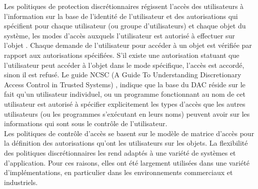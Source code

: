 Les politiques de protection discrétionnaires régissent l'accès des utilisateurs à l'information sur la base de l'identité de l'utilisateur et des autorisations qui spécifient pour chaque utilisateur (ou groupe d'utilisateurs) et chaque objet du système, les modes d'accès auxquels l'utilisateur est autorisé à effectuer sur l'objet \cite{sandhu94}. Chaque demande de l'utilisateur pour accéder à un objet est vérifiée par rapport aux autorisations spécifiées. S'il existe une autorisation statuant que l'utilisateur peut accéder à l'objet dans le mode spécifique, l'accès est accordé, sinon il est refusé. Le guide NCSC (A Guide To Understanding Discretionary Access Control in Trusted Systems) \cite{jordan87}, indique que la base du DAC réside sur le fait qu'un utilisateur individuel, ou un programme fonctionnant au nom de cet utilisateur est autorisé à spécifier explicitement les types d'accès que les autres utilisateurs (ou les programmes s'exécutant en leurs noms) peuvent avoir sur les informations qui sont sous le contrôle de l'utilisateur. \\
\hspace*{0.5cm} Les politiques de contrôle d'accès se basent sur le modèle de matrice d'accès pour la définition des autorisations qu'ont les utilisateurs sur les objets.
 La flexibilité des politiques discrétionnaires les rend adaptés à une variété de systèmes et d'application. Pour ces raisons, elles ont été largement utilisées dans une variété d'implémentations, en particulier dans les environnements commerciaux et industriels.

\label{sectionMatriceAccès}

